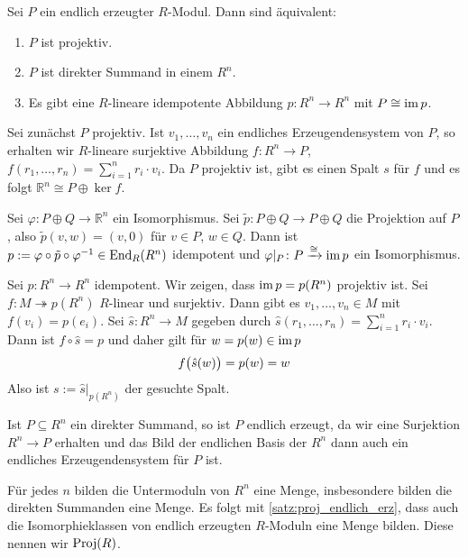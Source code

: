 \begin{satz}[{name=[{Äquivalenzen zur Projektivität endlich erzeugter Moduln}]},label=satz:proj_endlich_erz]
	Sei $P$ ein endlich erzeugter $R$-Modul.
	Dann sind äquivalent:
	\begin{enumerate}[1)]
		\item $P$ ist projektiv.
		\item $P$ ist direkter Summand in einem $R^n$.
		\item Es gibt eine $R$-lineare idempotente Abbildung $p \colon R^n \to R^n$ mit $P \cong \im p$.
	\end{enumerate}
\end{satz}
\begin{beweis}
	Sei zunächst $P$ projektiv.
	Ist $v_1,\ldots ,v_n$ ein endliches Erzeugendensystem von $P$, so erhalten wir $R$-lineare surjektive Abbildung $f \colon R^n \to P$, $f(r_1,\ldots,r_n)=\sum_{i=1}^n r_i \cdot v_i$.
	Da $P$ projektiv ist, gibt es einen Spalt $s$ für $f$ und es folgt $\mathbb{R}^n \cong P \oplus \ker f$.
	
	Sei $\varphi \colon P \oplus Q \to \mathbb{R}^n$ ein Isomorphismus.
	Sei $\tilde{p} \colon P \oplus  Q \to P \oplus Q$ die Projektion auf $P$, also $\tilde{p} (v,w) = (v,0)$ für $v \in P$, $w \in Q$.
	Dann ist $p := \varphi \circ \tilde{p} \circ \varphi^{-1} \in \End_R(R^n)$ idempotent und $\varphi|_{P} \colon P \xrightarrow{\cong} \im p$ ein Isomorphismus.
	
	Sei $p \colon R^n \to R^n$ idempotent.
	Wir zeigen, dass $\im p = p(R^n)$ projektiv ist.
	Sei $f \colon M \twoheadrightarrow p(R^n)$ $R$-linear und surjektiv.
	Dann gibt es $v_1,\ldots ,v_n \in M$ mit $f(v_i)= p(e_i)$.
	Sei $\hat{s} \colon R^n \to M$ gegeben durch $\hat{s}(r_1,\ldots ,r_n)=\sum_{i=1}^{n} r_i \cdot v_i$.
	Dann ist $f \circ \hat{s} =p$ und daher gilt für $w =p(w) \in \im p$
	\[
		f \enbrace[\big]{\hat{s}(w)} =p(w)=w
	\]
	Also ist $s:= \hat{s}|_{p(R^n)}$ der gesuchte Spalt.
\end{beweis}

\begin{bemerkung}[{name=[{direkte Summanden des $R^n$ sind endlich erzeugt}]}]
	Ist $P \subseteq R^n$ ein direkter Summand, so ist $P$ endlich erzeugt, da wir eine Surjektion $R^n \to P$ erhalten und das Bild der endlichen Basis der $R^n$ dann auch ein endliches Erzeugendensystem für $P$ ist.
\end{bemerkung}

\begin{bemerkung}
	Für jedes $n$ bilden die Untermoduln von $R^n$ eine Menge, insbesondere bilden die direkten Summanden eine Menge.
	Es folgt mit \autoref{satz:proj_endlich_erz}, dass auch die Isomorphieklassen von endlich erzeugten $R$-Moduln eine Menge bilden.
	Diese nennen wir $\Proj(R)$.
\end{bemerkung}

